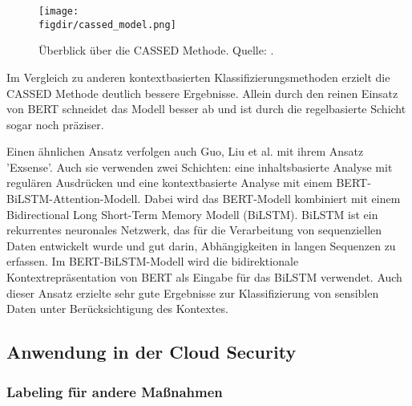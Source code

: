 \begin{figure}[htbp]
  \centering
  \texttt{[image: \\figdir/cassed\_model.png]}
  \caption{Überblick über die CASSED Methode. Quelle: \cite{Kuzina.2023}.}
  \label{f:cassed}
\end{figure}

Im Vergleich zu anderen kontextbasierten Klassifizierungsmethoden erzielt die CASSED Methode deutlich bessere Ergebnisse. Allein durch den reinen Einsatz von BERT schneidet das Modell besser ab und ist durch die regelbasierte Schicht sogar noch präziser.

Einen ähnlichen Ansatz verfolgen auch Guo, Liu et al. \cite{Guo.2021} mit ihrem Ansatz 'Exsense'. Auch sie verwenden zwei Schichten: eine inhaltsbasierte Analyse mit regulären Ausdrücken und eine kontextbasierte Analyse mit einem BERT-BiLSTM-Attention-Modell. Dabei wird das BERT-Modell kombiniert mit einem Bidirectional Long Short-Term Memory Modell (BiLSTM). BiLSTM ist ein rekurrentes neuronales Netzwerk, das für die Verarbeitung von sequenziellen Daten entwickelt wurde und gut darin, Abhängigkeiten in langen Sequenzen zu erfassen. Im BERT-BiLSTM-Modell wird die bidirektionale Kontextrepräsentation von BERT als Eingabe für das BiLSTM verwendet. Auch dieser Ansatz erzielte sehr gute Ergebnisse zur Klassifizierung von sensiblen Daten unter Berücksichtigung des Kontextes.



\subsection{Anwendung in der Cloud Security}

\subsubsection{Labeling für andere Maßnahmen}

